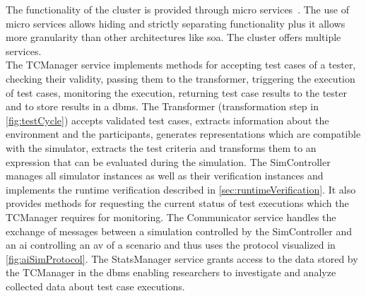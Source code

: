 \begin{figure}
\end{figure}
The functionality of the cluster is provided through micro services~\cite{microServices}.
The use of micro services allows hiding and strictly separating functionality plus it allows more granularity than other architectures like \gls{soa}.
The cluster offers multiple services.\\
The TCManager service implements methods for accepting test cases of a tester, checking their validity, passing them to the transformer, triggering the execution of test cases, monitoring the execution, returning test case results to the tester and to store results in a \gls{dbms}.
The Transformer (transformation step in \autoref{fig:testCycle}) accepts validated test cases, extracts information about the environment and the participants, generates representations which are compatible with the simulator, extracts the test criteria and transforms them to an expression that can be evaluated during the simulation.
The SimController manages all simulator instances as well as their verification instances and implements the runtime verification described in \autoref{sec:runtimeVerification}.
It also provides methods for requesting the current status of test executions which the TCManager requires for monitoring.
The Communicator service handles the exchange of messages between a simulation controlled by the SimController and an \gls{ai} controlling an \gls{av} of a scenario and thus uses the protocol visualized in \autoref{fig:aiSimProtocol}.
The StatsManager service grants access to the data stored by the TCManager in the \gls{dbms} enabling researchers to investigate and analyze collected data about test case executions.\par

